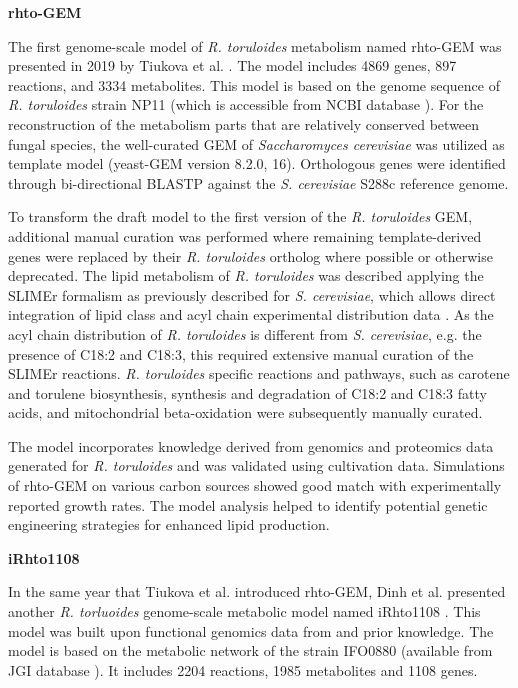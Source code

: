 \textbf{rhto-GEM}

The first genome-scale model of \textit{R. toruloides} metabolism named rhto-GEM was presented in 2019 by Tiukova et al. \cite{Tiukova2019}. The model includes 4869 genes, 897 reactions, and 3334 metabolites. This model is based on the genome sequence of \textit{R. toruloides} strain NP11 \cite{Zhu2012} (which is accessible from NCBI database \cite{NP11genome}). For the reconstruction of the metabolism parts that are relatively conserved between fungal species, the well-curated GEM of \textit{Saccharomyces cerevisiae} was utilized as template model (yeast-GEM version 8.2.0, 16). Orthologous genes were identified through bi-directional BLASTP against the \textit{S. cerevisiae} S288c reference genome.

To transform the draft model to the first version of the \textit{R. toruloides} GEM, additional manual curation was performed where remaining template-derived genes were replaced by their \textit{R. toruloides} 
ortholog where possible or otherwise deprecated. The lipid metabolism of \textit{R. toruloides} was described applying the SLIMEr formalism as previously described for \textit{S. cerevisiae}, which allows direct integration of lipid class and acyl chain experimental distribution data \cite{Sanchez2019}. As the acyl chain distribution of \textit{R. toruloides} is different from \textit{S. cerevisiae}, e.g. the presence of C18:2 and C18:3, this required extensive manual curation of the SLIMEr reactions. \textit{R. toruloides} specific reactions and pathways, such as carotene and torulene biosynthesis, synthesis and degradation of C18:2 and C18:3 fatty acids, and mitochondrial beta-oxidation were subsequently manually curated. \cite{Tiukova2019}

The model incorporates knowledge derived from genomics and proteomics data generated for \textit{R. toruloides} and was validated using cultivation data. Simulations of rhto-GEM on various carbon sources showed good match with experimentally reported growth rates. The model analysis helped to identify potential genetic engineering strategies for enhanced lipid production. \cite{Tiukova2019}


\textbf{iRhto1108}

In the same year that Tiukova et al. introduced rhto-GEM, Dinh et al. presented another \textit{R. torluoides} 
genome-scale metabolic model named iRhto1108 \cite{Dinh2019}. This model was built upon functional genomics data from \cite{Coradetti2018} and prior knowledge. The model is based on the metabolic network of the strain IFO0880 \cite{Coradetti2018} (available from JGI database \cite{IFO0880_v4}). It includes 2204 reactions, 1985 metabolites and 1108 genes. 

